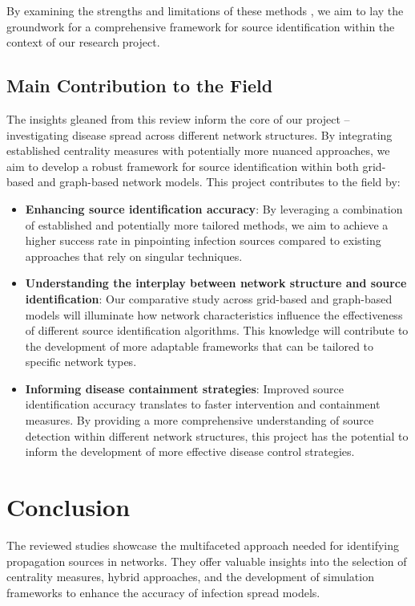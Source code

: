By examining the strengths and limitations of these methods \cite{wang2020, shelke2019, doe2018, liu2020}, we aim to lay the groundwork for a comprehensive framework for source identification within the context of our research project.

\subsection{Main Contribution to the Field}
The insights gleaned from this review inform the core of our project – investigating disease spread across different network structures. By integrating established centrality measures with potentially more nuanced approaches, we aim to develop a robust framework for source identification within both grid-based and graph-based network models. This project contributes to the field by:
\begin{itemize}
    \item \textbf{Enhancing source identification accuracy}: By leveraging a combination of established and potentially more tailored methods, we aim to achieve a higher success rate in pinpointing infection sources compared to existing approaches that rely on singular techniques.
    \item \textbf{Understanding the interplay between network structure and source identification}: Our comparative study across grid-based and graph-based models will illuminate how network characteristics influence the effectiveness of different source identification algorithms. This knowledge will contribute to the development of more adaptable frameworks that can be tailored to specific network types.
    \item \textbf{Informing disease containment strategies}: Improved source identification accuracy translates to faster intervention and containment measures. By providing a more comprehensive understanding of source detection within different network structures, this project has the potential to inform the development of more effective disease control strategies.
\end{itemize}

\section{Conclusion}
The reviewed studies showcase the multifaceted approach needed for identifying propagation sources in networks. They offer valuable insights into the selection of centrality measures, hybrid approaches, and the development of simulation frameworks to enhance the accuracy of infection spread models.
